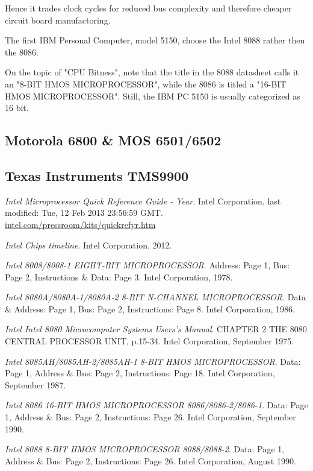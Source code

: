 \documentclass[twoside,twocolumn]{article}
\begin{document}
Hence it trades clock cycles for reduced bus complexity and therefore cheaper circuit
board manufactoring.

The first IBM Personal Computer, model 5150, choose the Intel 8088 rather then the 8086.

On the topic of "CPU Bitness", note that the title in the 8088 datasheet calls it an
"8-BIT HMOS MICROPROCESSOR"\cite{intel8088}, while the 8086 is titled a "16-BIT HMOS
MICROPROCESSOR"\cite{intel8086}. Still, the IBM PC 5150 is usually categorized as 16 bit.

\subsection{Motorola 6800 \& MOS 6501/6502}

\subsection{Texas Instruments TMS9900}


\begin{thebibliography}{99} %

\textit{Intel Microprocessor Quick Reference Guide - Year}.
Intel Corporation, last modified: Tue, 12 Feb 2013 23:56:59 GMT.
\href{https://www.intel.com/pressroom/kits/quickrefyr.htm}{intel.com/pressroom/kits/quickrefyr.htm}

\textit{Intel Chips timeline}.
Intel Corporation, 2012.

\textit{Intel 8008/8008-1 EIGHT-BIT MICROPROCESSOR}.
Address: Page 1, Bus: Page 2, Instructions \& Data: Page 3.
Intel Corporation, 1978.

\textit{Intel 8080A/8080A-1/8080A-2 8-BIT N-CHANNEL MICROPROCESSOR}.
Data \& Address: Page 1, Bus: Page 2, Instructions: Page 8.
Intel Corporation, 1986.

\textit{Intel Intel 8080 Microcomputer Systems Users's Manual}.
CHAPTER 2 THE 8080 CENTRAL PROCESSOR UNIT, p.15-34.
Intel Corporation, September 1975.

\textit{Intel 8085AH/8085AH-2/8085AH-1 8-BIT HMOS MICROPROCESSOR}.
Data: Page 1, Address \& Bus: Page 2, Instructions: Page 18.
Intel Corporation, September 1987.

\textit{Intel 8086 16-BIT HMOS MICROPROCESSOR 8086/8086-2/8086-1}.
Data: Page 1, Address \& Bus: Page 2, Instructions: Page 26.
Intel Corporation, September 1990.

\textit{Intel 8088 8-BIT HMOS MICROPROCESSOR 8088/8088-2}.
Data: Page 1, Address \& Bus: Page 2, Instructions: Page 26.
Intel Corporation, August 1990.

\end{thebibliography}

\end{document}
